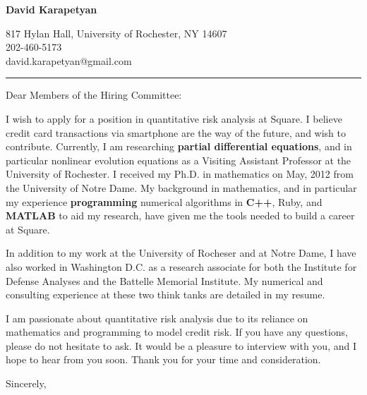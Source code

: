 \documentclass[12pt]{letter}
\date{\vspace{0.5cm}\flushleft}
\begin{document}
\begin{letter}{}
\begin{center}
{\bf {\Large David Karapetyan}}
\end{center}

\begin{center}
{817 Hylan Hall, University of Rochester, NY 14607  \\ 
202-460-5173 \\  david.karapetyan@gmail.com
}
\end{center}
\hrule

\opening{Dear Members of the Hiring Committee:\\}
%
%
I wish to apply for a position in quantitative risk analysis at Square. I believe credit card transactions via smartphone are the way of the future, and wish to contribute. Currently, I am researching \textbf{partial differential equations}, and in particular nonlinear evolution equations as a Visiting Assistant Professor at the University of Rochester. I received my Ph.D. in mathematics on May, 2012 from the University of Notre Dame. My
background in mathematics, and in particular my experience
\textbf{programming} numerical algorithms in \textbf{C++}, Ruby, and \textbf{MATLAB}
to aid my research, have given me the tools needed to build a career at Square.

In addition to my work at the University of Rocheser and at Notre Dame, I have also worked in Washington D.C. as a research
associate for both the Institute for Defense Analyses and the Battelle Memorial
Institute. My numerical and consulting experience at these two think tanks are
detailed in my resume. 

I am passionate about quantitative risk analysis due to its reliance on mathematics and programming to model credit risk. If you have any questions, please do not hesitate to ask. It would be a
pleasure to interview with you, and I hope to hear from you soon. Thank you for
your time and consideration. 

\closing{Sincerely,}


\end{letter}
\end{document}
